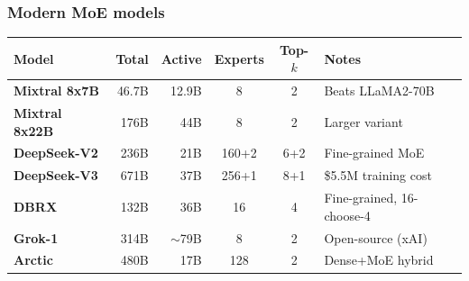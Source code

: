 \documentclass[aspectratio=169]{beamer}
\begin{document}
\begin{frame}
\frametitle{Modern MoE models}

\vspace{-0.2cm}
\renewcommand{\arraystretch}{1.3}
\begin{center}
{\small
\begin{tabular}{>{\bfseries}l r r c c l}
  \textbf{Model} & \textbf{Total} & \textbf{Active} & \textbf{Experts} & \textbf{Top-$k$} & \textbf{Notes} \\
  \hline
  \textcolor{popblue}{Mixtral 8x7B} & 46.7B & 12.9B & 8 & 2 & Beats LLaMA2-70B \\[1pt]
  \textcolor{popblue}{Mixtral 8x22B} & 176B & 44B & 8 & 2 & Larger variant \\[1pt]
  \textcolor{paramgreen}{DeepSeek-V2} & 236B & 21B & 160+2 & 6+2 & Fine-grained MoE \\[1pt]
  \textcolor{paramgreen}{DeepSeek-V3} & 671B & 37B & 256+1 & 8+1 & \$5.5M training cost \\[1pt]
  \textcolor{orange1}{DBRX} & 132B & 36B & 16 & 4 & Fine-grained, 16-choose-4 \\[1pt]
  \textcolor{violet1}{Grok-1} & 314B & $\sim$79B & 8 & 2 & Open-source (xAI) \\[1pt]
  \textcolor{sampred}{Arctic} & 480B & 17B & 128 & 2 & Dense+MoE hybrid \\
  \hline
\end{tabular}
}
\end{center}

\vspace{0.2cm}
\begin{center}
\end{center}
\end{frame}
\end{document}
